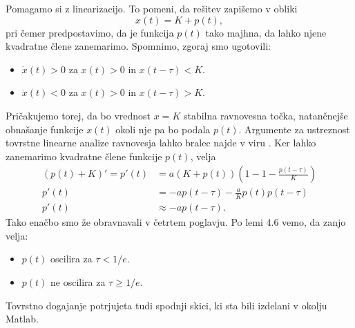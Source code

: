 \documentclass[12pt,a4paper]{amsart}
\theoremstyle{definition} %
\theoremstyle{plain} %
\begin{document}
Pomagamo si z linearizacijo. To pomeni, da rešitev zapišemo v obliki $$x(t)=K+p(t),$$ pri čemer predpostavimo, da je 
funkcija $p(t)$ tako majhna, da lahko njene kvadratne člene zanemarimo. Spomnimo, zgoraj smo ugotovili:
\begin{itemize}
    \item $\dot{x}(t)>0$ za $x(t)>0$ in $x(t-\tau)<K$.
    \item $\dot{x}(t)<0$ za $x(t)>0$ in $x(t-\tau)>K$.
\end{itemize}
Pričakujemo torej, da bo vrednost $x=K$ stabilna ravnovesna točka, natančnejše obnašanje funkcije $x(t)$ okoli nje pa bo 
podala $p(t)$. Argumente za ustreznost tovrstne linearne analize ravnovesja lahko bralec najde v viru \cite{analiza}.
Ker lahko zanemarimo kvadratne člene funkcije $p(t)$, velja
\begin{equation*}
    \begin{split}
        (p(t)+K)'= p'(t) &=  a(K+p(t))\left(1-1-\frac{p(t-\tau)}{K}\right) \\
        p'(t) &= -ap(t-\tau)-\frac{a}{K}p(t)p(t-\tau) \\
        p'(t) &\approx -ap(t-\tau).
    \end{split}
\end{equation*}
Tako enačbo smo že obravnavali v četrtem poglavju. Po lemi 4.6 vemo, da zanjo velja:
\begin{itemize}
    \item $p(t)$ oscilira za $\tau<1/e$.
    \item $p(t)$ ne oscilira za $\tau\geq1/e$.
\end{itemize} 
Tovrstno dogajanje potrjujeta tudi spodnji skici, ki sta bili izdelani v okolju Matlab.

\newpage
\overfullrule=0mm\printbibliography
\end{document}
